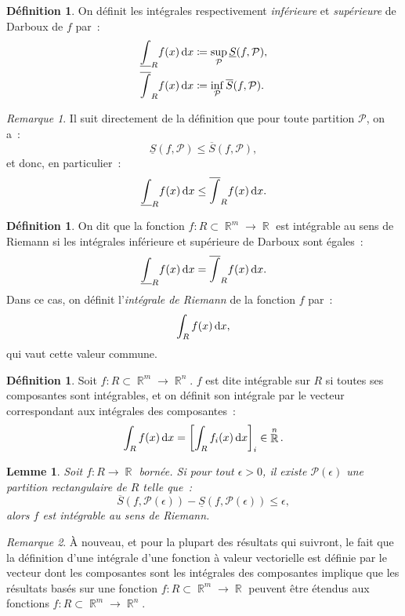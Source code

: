 \documentclass{article}
\DeclareMathOperator{\R}{\mathbb R}
\newtheorem{lem}[thm]{Lemme}
\theoremstyle{definition}
\newtheorem{déf}[thm]{Définition}
\theoremstyle{remark}
\newtheorem*{rmq}{Remarque}
\begin{document}
		\begin{déf} On définit les intégrales respectivement \emph{inférieure} et \emph{supérieure} de Darboux de $f$ par~:
		\begin{align*}
			\underline \int_R f(x)\dif x &\coloneqq \sup_{\mathcal P} \underline S(f, \mathcal P), \\
			\overline  \int_R f(x)\dif x &\coloneqq \inf_{\mathcal P} \overline  S(f, \mathcal P).
		\end{align*}
		\end{déf}

		\begin{rmq} Il suit directement de la définition que pour toute partition $\mathcal P$, on a~:
		\[\underline S(f, \mathcal P) \leq \overline S(f, \mathcal P),\]
		et donc, en particulier~:
		\[\underline \int_R f(x)\dif x \leq \overline \int_R f(x)\dif x.\]
		\end{rmq}

		\begin{déf} On dit que la fonction $f : R \subset \R^m \to \R$ est intégrable au sens de Riemann si les intégrales inférieure et supérieure de
		Darboux sont égales~:
		\[\underline \int_R f(x)\dif x = \overline \int_R f(x)\dif x.\]
		Dans ce cas, on définit l'\emph{intégrale de Riemann} de la fonction $f$ par~:
		\[\int_R f(x)\dif x,\]
		qui vaut cette valeur commune.
		\end{déf}

		\begin{déf} Soit $f : R \subset \R^m \to \R^n$. $f$ est dite intégrable sur $R$ si toutes ses composantes sont intégrables, et on définit son intégrale
		par le vecteur correspondant aux intégrales des composantes~:
		\[\int_R f(x)\dif x = \left[\int_R f_i(x)\dif x\right]_i \in \R^n.\]
		\end{déf}

		\begin{lem}\label{lem:intégrablesiepsilonP(epsilon)} Soit $f : R \to \R$ bornée. Si pour tout $\epsilon > 0$, il existe $\mathcal P(\epsilon)$ une
		partition rectangulaire de $R$ telle que~:
		\[\overline S(f, \mathcal P(\epsilon)) - \underline S(f, \mathcal P(\epsilon)) \leq \epsilon,\]
		alors $f$ est intégrable au sens de Riemann.
		\end{lem}

		\begin{rmq} À nouveau, et pour la plupart des résultats qui suivront, le fait que la définition d'une intégrale d'une fonction à valeur vectorielle est
		définie par le vecteur dont les composantes sont les intégrales des composantes implique que les résultats basés sur une fonction
		$f : R \subset \R^m \to \R$ peuvent être étendus aux fonctions $f : R \subset \R^m \to \R^n$.
		\end{rmq}
\end{document}
